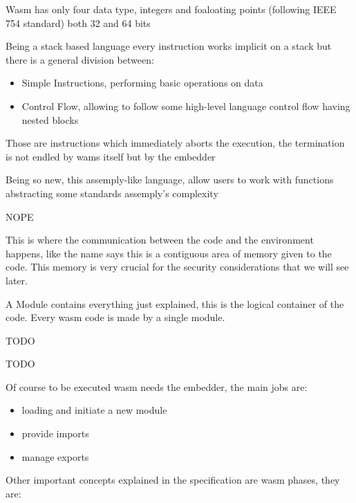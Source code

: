 \documentclass[../main.tex]{subfiles}
\begin{document}
\begin{description} [style=nextline]
  \item[Values]
        Wasm has only four data type, integers and foaloating points (following IEEE 754 standard) both 32 and 64 bits
  \item[Instructions]
        Being a stack based language every instruction works implicit on a stack but there is a general division between:
        \begin{itemize}
          \item Simple Instructions, performing basic operations on data
          \item Control Flow, allowing to follow some high-level language control flow having nested blocks
        \end{itemize}
  \item[Traps]
        Those are instructions which immediately aborts the execution, the termination is not endled by wams itself but by the embedder
  \item[Functions]
        Being so new, this assemply-like language, allow users to work with functions abstracting some standards assemply's complexity
  \item[Table] NOPE
  \item[Linear Memory]
        This is where the communication between the code and the environment happens, like the name says this is a contiguous area of memory given to the code. This memory is very crucial for the security considerations that we will see later.
  \item[Modules]
        A Module contains everything just explained, this is the logical container of the code. Every wasm code is made by a single module.
  \item[Imports] TODO
  \item[Exports] TODO
  \item[Embedder]
        Of course to be executed wasm needs the embedder, the main jobs are:
        \begin{itemize}
          \item loading and initiate a new module
          \item provide imports
          \item manage exports
        \end{itemize}
\end{description}

Other important concepts explained in the specification are wasm phases, they are:
\end{document}
